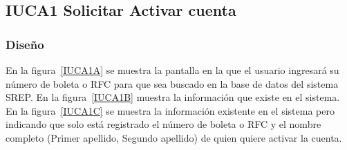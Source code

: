 
\subsection{IUCA1 Solicitar Activar cuenta}

\subsubsection{Diseño}

En la figura~\ref{IUCA1A} se muestra la pantalla en la que el usuario ingresará su número de boleta o RFC para que sea buscado en la base de datos del sistema SREP. En la figura~\ref{IUCA1B} muestra la información que existe en el sistema. En la figura~\ref{IUCA1C} se muestra la información existente en el sistema pero indicando que solo está registrado el número de boleta o RFC y el nombre completo (Primer apellido, Segundo apellido) de quien quiere activar la cuenta. 

